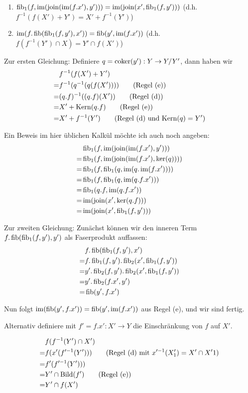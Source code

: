 \begin{lemm} $\quad$ %
\begin{enumerate}
\item $\operatorname{fib}_1(f,\operatorname{im}(\operatorname{join}(\operatorname{im}(f.x'),y'))) = \operatorname{im}(\operatorname{join}(x',\operatorname{fib}_1(f,y')))$ (d.h. $f^{-1}(f(X')+Y') = X' + f^{-1}(Y')$)
\item $\operatorname{im}(f.\operatorname{fib}(\operatorname{fib}_1(f,y'),x')) = \operatorname{fib}(y',\operatorname{im}(f.x'))$ (d.h. $f(f^{-1}(Y')\cap X) = Y' \cap f(X')$)
\end{enumerate}
\end{lemm}
\begin{bew}

Zur ersten Gleichung:
Definiere $q = \operatorname{coker}(y') : Y \to Y/Y'$, dann haben wir
\begin{align*}
   & f^{-1}(f(X') + Y')
\\=& f^{-1}(q^{-1}(q(f(X')))) \qquad \text{(Regel (e))}
\\=& (q.f)^{-1}((q.f)(X')) \qquad \text{(Regel (d))}
\\=& X' + \operatorname{Kern}(q.f) \qquad\text{(Regel (e))}
\\=& X' + f^{-1}(Y') \qquad\text{(Regel (d) und $\operatorname{Kern}(q) = Y'$)}
\end{align*}

Ein Beweis im hier üblichen Kalkül möchte ich auch noch angeben:
\begin{align*}
   & \operatorname{fib}_1(f, \operatorname{im}(\operatorname{join}(\operatorname{im}(f.x'),y')))
\\=& \operatorname{fib}_1(f, \operatorname{im}(\operatorname{join}(\operatorname{im}(f.x'),\ker(q))))
\\=& \operatorname{fib}_1(f, \operatorname{fib}_1(q,\operatorname{im}(q.\operatorname{im}(f.x'))))
\\=& \operatorname{fib}_1(f, \operatorname{fib}_1(q,\operatorname{im}(q.f.x')))
\\=& \operatorname{fib}_1(q.f, \operatorname{im}(q.f.x'))
\\=& \operatorname{im}(\operatorname{join}(x',\ker(q.f)))
\\=& \operatorname{im}(\operatorname{join}(x',\operatorname{fib}_1(f,y')))
\end{align*}

Zur zweiten Gleichung:
Zunächst können wir den inneren Term $f.\operatorname{fib}(\operatorname{fib}_1(f,y'),y')$ als Faserprodukt auffassen:
\begin{align*}
   & f.\operatorname{fib}(\operatorname{fib}_1(f,y'),x')
\\=& f.\operatorname{fib}_1(f,y').\operatorname{fib}_2(x',\operatorname{fib}_1(f,y'))
\\=& y'.\operatorname{fib}_2(f,y').\operatorname{fib}_2(x',\operatorname{fib}_1(f,y'))
\\=& y'.\operatorname{fib}_2(f.x',y')
\\=& \operatorname{fib}(y',f.x')
\end{align*}

Nun folgt $\operatorname{im}(\operatorname{fib}(y',f.x')) = \operatorname{fib}(y',\operatorname{im}(f.x'))$ aus Regel (e), und wir sind fertig.

Alternativ definiere mit $f' = f.x' : X' \to Y$ die Einschränkung von $f$ auf $X'$.

\begin{align*}
   & f(f^{-1}(Y')\cap X')
\\=& f(x'(f'^{-1}(Y'))) \qquad\text{(Regel (d) mit $x'^{-1}(X'_1) = X' \cap X'1$)}
\\=& f'(f'^{-1}(Y')))
\\=& Y' \cap \operatorname{Bild}(f') \qquad\text{(Regel (e))}
\\=& Y' \cap f(X')
\end{align*}
\end{bew}
